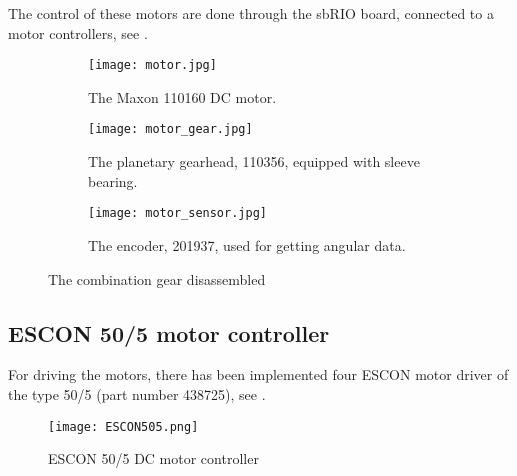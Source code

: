 The control of these motors are done through the sbRIO board, connected to a motor controllers, see .

\begin{figure}[H]
	\centering
	\begin{subfigure}{.32\textwidth}
		\vspace{0pt}
		\centering
		\texttt{[image: motor.jpg]}
		\caption{The Maxon 110160 \newline DC motor.}
		\label{fig:motor}
	\end{subfigure}
	\begin{subfigure}{.32\textwidth}
		\centering
		\texttt{[image: motor\_gear.jpg]}
		\caption{The planetary gearhead, 110356, equipped with sleeve bearing.}
		\label{fig:motor_gear}
	\end{subfigure}
	\begin{subfigure}{.32\textwidth}
	\hspace{5pt}
		\centering
		\texttt{[image: motor\_sensor.jpg]}
		\caption{The encoder, 201937, used for getting angular data.}
		\label{fig:motor_sensor}
	\end{subfigure}
	\caption{The combination gear disassembled}
	\label{fig:Full_motor _dis}
\end{figure}





\subsection{ESCON 50/5 motor controller}\label{sec:motor_control}
For driving the motors, there has been implemented four ESCON motor driver of the type 50/5 (part number 438725), see . 

\begin{figure}[H]
	\centering
		\centering
		\texttt{[image: ESCON505.png]}
		\caption{ESCON 50/5 DC motor controller\cite{ESCON_motor_controller}}
		\label{fig:ESCON505}
\end{figure}

